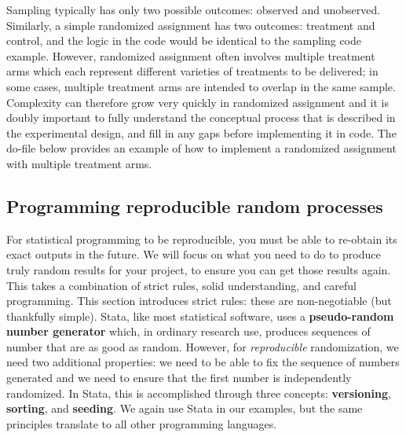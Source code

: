 
Sampling typically has only two possible outcomes: observed and unobserved.
Similarly, a simple randomized assignment has two outcomes: treatment and control,
and the logic in the code would be identical to the sampling code example.
However, randomized assignment often involves multiple treatment arms
which each represent different varieties of treatments to be delivered;
in some cases, multiple treatment arms are intended to overlap in the same sample.
Complexity can therefore grow very quickly in randomized assignment
and it is doubly important to fully understand the conceptual process
that is described in the experimental design,
and fill in any gaps before implementing it in code.
The do-file below provides an example of how to implement
a randomized assignment with multiple treatment arms.



\subsection{Programming reproducible random processes}

For statistical programming to be reproducible,
you must be able to re-obtain its exact outputs in the future.\cite{orozco2018make}
We will focus on what you need to do to produce
truly random results for your project,
to ensure you can get those results again.
This takes a combination of strict rules, solid understanding, and careful programming.
This section introduces strict rules:
these are non-negotiable (but thankfully simple).
Stata, like most statistical software, uses a \textbf{pseudo-random number generator}
which, in ordinary research use, 
produces sequences of number that are as good as random.
However, for \textit{reproducible} randomization, we need two additional properties:
we need to be able to fix the sequence of numbers generated and
we need to ensure that the first number is independently randomized.
In Stata, this is accomplished through three concepts:
\textbf{versioning}, \textbf{sorting}, and \textbf{seeding}.
We again use Stata in our examples,
but the same principles translate to all other programming languages.

